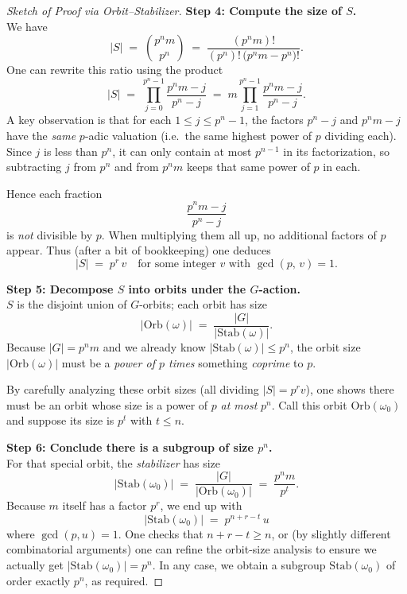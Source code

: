 \documentclass[12pt]{article}
\theoremstyle{definition} %
\theoremstyle{plain} %
\begin{document}
\begin{proof}[Sketch of Proof via Orbit--Stabilizer]
    \medskip
    
    \textbf{Step 4: Compute the size of $S$.}\\
    We have
    \[
       |S| 
       \;=\; \binom{p^n m}{p^n} 
       \;=\;
       \frac{(p^n m)!}{(p^n)!\,\bigl(p^n m - p^n\bigr)!}.
    \]
    One can rewrite this ratio using the product
    \[
       |S|
       \;=\;
       \prod_{j=0}^{p^n -1} \frac{p^n m - j}{p^n - j}
       \;=\;
       m \prod_{j=1}^{p^n-1} \frac{p^n m - j}{p^n - j}.
    \]
    A key observation is that for each $1 \le j \le p^n - 1$, 
    the factors $p^n - j$ and $p^n m - j$ have the \emph{same} $p$-adic valuation 
    (i.e.\ the same highest power of $p$ dividing each). 
    Since $j$ is less than $p^n$, it can only contain at most $p^{n-1}$ in its factorization, 
    so subtracting $j$ from $p^n$ and from $p^n m$ keeps that same power of $p$ in each.  
    
    Hence each fraction
    \[
       \frac{p^n m - j}{p^n - j}
    \]
    is \emph{not} divisible by $p$.  
    When multiplying them all up, no additional factors of $p$ appear.  
    Thus (after a bit of bookkeeping) one deduces
    \[
       |S| \;=\; p^r \,v
       \quad\text{for some integer }v \text{ with } \gcd(p,\,v)=1.
    \]
    
    \medskip
    
    \textbf{Step 5: Decompose $S$ into orbits under the $G$-action.}\\
    $S$ is the disjoint union of $G$-orbits; each orbit has size 
    \[
       |\mathrm{Orb}(\omega)| 
       \;=\; \frac{|G|}{|\mathrm{Stab}(\omega)|}.
    \]
    Because $|G|=p^n m$ and we already know $|\mathrm{Stab}(\omega)| \le p^n$, 
    the orbit size $|\mathrm{Orb}(\omega)|$ must be a \emph{power of $p$ times} something \emph{coprime} to $p$.  
    
    \smallskip
    By carefully analyzing these orbit sizes (all dividing $|S|=p^r v$), one shows there must be an orbit 
    whose size is a power of $p$ \emph{at most} $p^n$.  Call this orbit $\mathrm{Orb}(\omega_0)$ and suppose its size is 
    $p^t$ with $t \le n$.
    
    \medskip
    
    \textbf{Step 6: Conclude there is a subgroup of size $p^n$.}\\
    For that special orbit, the \emph{stabilizer} has size
    \[
       |\mathrm{Stab}(\omega_0)| 
       \;=\;
       \frac{|G|}{|\mathrm{Orb}(\omega_0)|}
       \;=\;
       \frac{p^n m}{p^t}.
    \]
    Because $m$ itself has a factor $p^r$, we end up with 
    \[
       |\mathrm{Stab}(\omega_0)|
       \;=\;
       p^{n + r - t}\,u
    \]
    where $\gcd(p,u)=1$.  One checks that $n + r - t \ge n$, or (by slightly different combinatorial arguments) 
    one can refine the orbit-size analysis to ensure we actually get $|\mathrm{Stab}(\omega_0)| = p^n$. 
    In any case, we obtain a subgroup $\mathrm{Stab}(\omega_0)$ of order exactly $p^n$, 
    as required.
    
    \end{proof}
    
\end{document}
